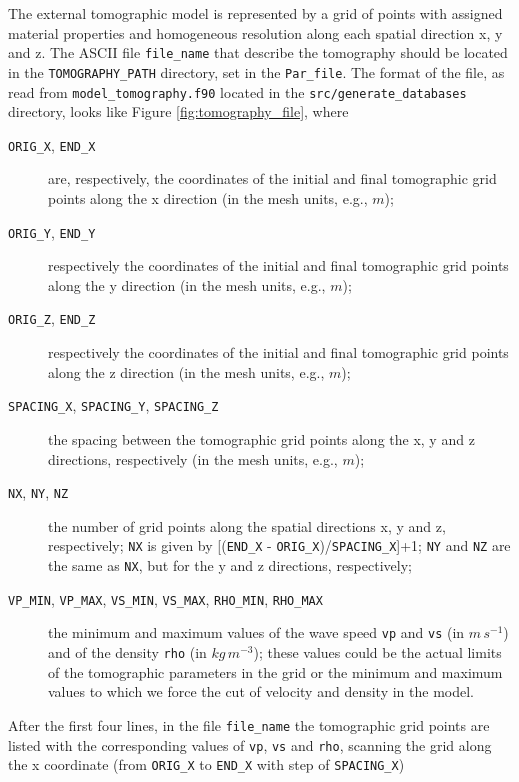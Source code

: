 The external tomographic model is represented by a grid of points
with assigned material properties and homogeneous resolution along
each spatial direction x, y and z. The ASCII file \texttt{file\_name}
that describe the tomography should be located in the \texttt{TOMOGRAPHY\_PATH}
directory, set in the \texttt{Par\_file}. The format of the file,
as read from \texttt{model\_tomography.f90} located in the \texttt{src/generate\_databases}
directory, looks like Figure \ref{fig:tomography_file}, where
\begin{description}
\item [{\texttt{ORIG\_X}, \texttt{END\_X}}] are, respectively, the coordinates
of the initial and final tomographic grid points along the x direction
(in the mesh units, e.g., $m$);
\item [{\texttt{ORIG\_Y}, \texttt{END\_Y}}] respectively the coordinates
of the initial and final tomographic grid points along the y direction
(in the mesh units, e.g., $m$);
\item [{\texttt{ORIG\_Z}, \texttt{END\_Z}}] respectively the coordinates
of the initial and final tomographic grid points along the z direction
(in the mesh units, e.g., $m$);
\item [{\texttt{SPACING\_X}, \texttt{SPACING\_Y}, \texttt{SPACING\_Z}}] the
spacing between the tomographic grid points along the x, y and z directions,
respectively (in the mesh units, e.g., $m$);
\item [{\texttt{NX}, \texttt{NY}, \texttt{NZ}}] the number of grid points
along the spatial directions x, y and z, respectively; \texttt{NX}
is given by {[}(\texttt{END\_X} - \texttt{ORIG\_X})/\texttt{SPACING\_X}{]}+1;
\texttt{NY} and \texttt{NZ} are the same as \texttt{NX}, but for the
y and z directions, respectively;
\item [{\texttt{VP\_MIN}, \texttt{VP\_MAX}, \texttt{VS\_MIN}, \texttt{VS\_MAX}, \texttt{RHO\_MIN}, \texttt{RHO\_MAX}}] the
minimum and maximum values of the wave speed \texttt{vp} and \texttt{vs}
(in $m\, s^{-1}$) and of the density \texttt{rho} (in $kg\, m^{-3}$);
these values could be the actual limits of the tomographic parameters
in the grid or the minimum and maximum values to which we force the
cut of velocity and density in the model.
\end{description}
After the first four lines, in the file \texttt{file\_name} the tomographic
grid points are listed with the corresponding values of \texttt{vp},
\texttt{vs} and \texttt{rho}, scanning the grid along the x coordinate
(from \texttt{ORIG\_X} to \texttt{END\_X} with step of \texttt{SPACING\_X})
